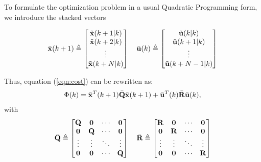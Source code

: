 \documentclass[conference]{IEEEtran} %
\begin{document}
To formulate the optimization problem in a usual Quadratic Programming form, we introduce the
stacked vectors

\begin{equation*}
	\bar{\bf x}(k+1) \triangleq \begin{bmatrix}
		\tilde{\bf x}(k+1|k) \\ \tilde{\bf x}(k+2|k) \\ \vdots \\ \tilde{\bf x}(k+N|k) 
	\end{bmatrix} \quad
	\bar{\bf u}(k) \triangleq \begin{bmatrix}
		\tilde{\bf u}(k|k)  \\ \tilde{\bf u}(k+1|k) \\ \vdots \\ \tilde{\bf u}(k+N-1|k)
	\end{bmatrix}
\end{equation*}

Thus, equation (\ref{eqn:cost}) can be rewritten as:
\begin{equation}\label{eqn:cost2}
	\Phi(k) = \bar{\bf x}^T(k+1)\bar{\bf Q}\bar{\bf x}(k+1) + \bar{\bf u}^T(k)\bar{\bf R}\bar{\bf u}(k),
\end{equation}
with
\begin{equation*}
	\bar {\bf Q} \triangleq \begin{bmatrix}
		{\bf Q} & {\bf 0} & \cdots & {\bf 0} \\
		{\bf 0} & {\bf Q} & \cdots & {\bf 0} \\
		\vdots  & \vdots  & \ddots & \vdots  \\
		{\bf 0} & {\bf 0} & \cdots & {\bf Q}
	\end{bmatrix} \quad
	\bar {\bf R} \triangleq \begin{bmatrix}
		{\bf R} & {\bf 0} & \cdots & {\bf 0} \\
		{\bf 0} & {\bf R} & \cdots & {\bf 0} \\
		\vdots  & \vdots  & \ddots & \vdots  \\
		{\bf 0} & {\bf 0} & \cdots & {\bf R}
	\end{bmatrix}
\end{equation*}
\end{document}
